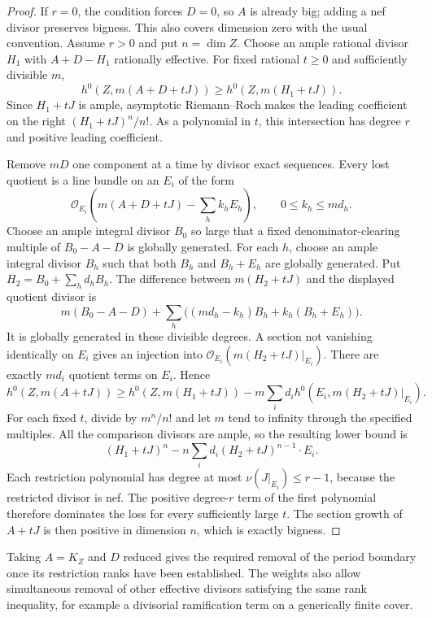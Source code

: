 \begin{proof}
If $r=0$, the condition forces $D=0$, so $A$ is already big;
adding a nef divisor preserves bigness. This also covers dimension
zero with the usual convention. Assume $r>0$ and put $n=\dim Z$.
Choose an ample rational divisor $H_1$ with
$A+D-H_1$ rationally effective. For fixed rational $t\geq0$
and sufficiently divisible $m$,
\[
 h^0(Z,m(A+D+tJ))\geq h^0(Z,m(H_1+tJ)).
\]
Since $H_1+tJ$ is ample, asymptotic Riemann--Roch makes the
leading coefficient on the right
$(H_1+tJ)^n/n!$. As a polynomial in $t$, this intersection has
degree $r$ and positive leading coefficient.

Remove $mD$ one component at a time by divisor exact sequences.
Every lost quotient is a line bundle on an $E_i$ of the form
\[
 \mathcal O_{E_i}\left(m(A+D+tJ)-\sum_h k_hE_h\right),
 \qquad 0\leq k_h\leq md_h.
\]
Choose an ample integral divisor $B_0$ so large that a fixed
denominator-clearing multiple of $B_0-A-D$ is globally generated.
For each $h$, choose an ample integral divisor $B_h$ such that
both $B_h$ and $B_h+E_h$ are globally generated. Put
$H_2=B_0+\sum_h d_hB_h$. The difference between
$m(H_2+tJ)$ and the displayed quotient divisor is
\[
 m(B_0-A-D)+
 \sum_h\bigl((md_h-k_h)B_h+k_h(B_h+E_h)\bigr).
\]
It is globally generated in these divisible degrees. A section
not vanishing identically on $E_i$ gives an injection into
$\mathcal O_{E_i}(m(H_2+tJ)|_{E_i})$. There are exactly
$md_i$ quotient terms on $E_i$. Hence
\[
 h^0(Z,m(A+tJ))
 \geq h^0(Z,m(H_1+tJ))
       -m\sum_i d_i h^0(E_i,m(H_2+tJ)|_{E_i}).
\]
For each fixed $t$, divide by $m^n/n!$ and let $m$ tend to
infinity through the specified multiples. All the comparison
divisors are ample, so the resulting lower bound is
\[
 (H_1+tJ)^n
     -n\sum_i d_i(H_2+tJ)^{n-1}\cdot E_i.
\]
Each restriction polynomial has degree at most
$\nu(J|_{E_i})\leq r-1$, because the restricted divisor is nef.
The positive degree-$r$ term of the first polynomial therefore
dominates the loss for every sufficiently large $t$. The section
growth of $A+tJ$ is then positive in dimension $n$, which is
exactly bigness.
\end{proof}

Taking $A=K_Z$ and $D$ reduced gives the required removal of the
period boundary once its restriction ranks have been established.
The weights also allow simultaneous removal of other effective
divisors satisfying the same rank inequality, for example a
divisorial ramification term on a generically finite cover.


